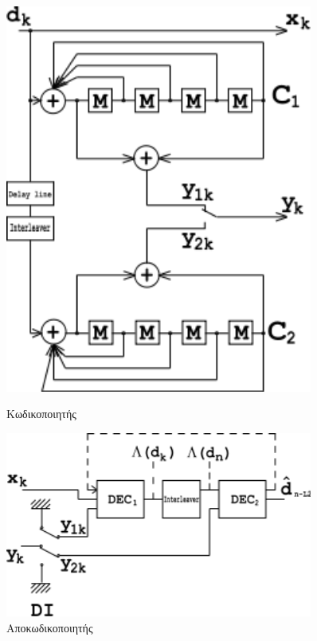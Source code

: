 \begin{figure}[h]
    \centering
    \begin{minipage}{0.45\textwidth}
        \centering
        \includegraphics[width=0.9\textwidth]{figures/Turbo_encoder.png}
        \caption{Κωδικοποιητής }
    \end{minipage}\hfill
    \begin{minipage}{0.45\textwidth}
        \centering
        \includegraphics[width=0.9\textwidth]{figures/Turbo_decoder.png}
        \caption{Αποκωδικοποιητής }
    \end{minipage}
\end{figure}

